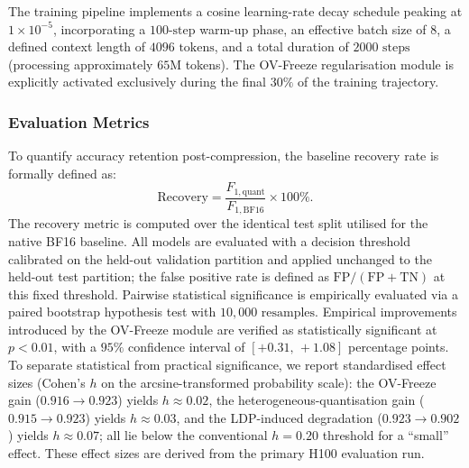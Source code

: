 \documentclass[a4paper,fleqn]{cas-sc}
\begin{document}
The training pipeline implements a cosine learning-rate decay schedule peaking at $1\times10^{-5}$, incorporating a $100\text{-step}$ warm-up phase, an effective batch size of $8$, a defined context length of $4096\text{~tokens}$, and a total duration of $2000\text{~steps}$ (processing approximately $65\text{M}$ tokens). The OV-Freeze regularisation module is explicitly activated exclusively during the final $30\%$ of the training trajectory.

\subsubsection{Evaluation Metrics}

To quantify accuracy retention post-compression, the baseline recovery rate is formally defined as:
\begin{equation}
\label{eq:recovery}
\mathrm{Recovery} = \frac{F_{1,\mathrm{quant}}}{F_{1,\mathrm{BF16}}} \times 100\%.
\end{equation}
The recovery metric is computed over the identical test split utilised for the native BF16 baseline. All models are evaluated with a decision threshold calibrated on the held-out validation partition and applied unchanged to the held-out test partition; the false positive rate is defined as $\mathrm{FP}/(\mathrm{FP}+\mathrm{TN})$ at this fixed threshold. Pairwise statistical significance is empirically evaluated via a paired bootstrap hypothesis test with $10{,}000\text{~resamples}$. Empirical improvements introduced by the OV-Freeze module are verified as statistically significant at $p<0.01$, with a $95\%$ confidence interval of $[+0.31,\,+1.08]$ percentage points. To separate statistical from practical significance, we report standardised effect sizes (Cohen's $h$ on the arcsine-transformed probability scale): the OV-Freeze gain ($0.916 \rightarrow 0.923$) yields $h \approx 0.02$, the heterogeneous-quantisation gain ($0.915 \rightarrow 0.923$) yields $h \approx 0.03$, and the LDP-induced degradation ($0.923 \rightarrow 0.902$) yields $h \approx 0.07$; all lie below the conventional $h = 0.20$ threshold for a ``small'' effect. These effect sizes are derived from the primary H100 evaluation run.
\end{document}
